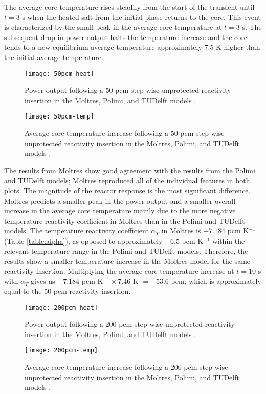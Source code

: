 The average core temperature rises steadily from the start of the transient
until $t=3$ s when the heated salt from the initial phase returns to the core.
This event is characterized by the small peak in the average core temperature
at $t=3$ s. The subsequent drop in power output halts the temperature
increase and the core tends to a new equilibrium average temperature
approximately 7.5 K higher than the initial average temperature.

\begin{figure}[htbp!]
    \centering
    \texttt{[image: 50pcm-heat]}
    \caption{Power output following a 50 pcm step-wise unprotected reactivity
    insertion in the Moltres, Polimi, and
    TUDelft models \cite{fiorina_modelling_2014}.}
    \label{fig:50pcmheat}
%
    \centering
    \texttt{[image: 50pcm-temp]}
    \caption{Average core temperature increase following a 50 pcm step-wise
    unprotected reactivity insertion in the Moltres, Polimi, and
    TUDelft models \cite{fiorina_modelling_2014}.}
    \label{fig:50pcmtemp}
\end{figure}

The results from Moltres show good agreement with the results from the Polimi
and TUDelft models; Moltres reproduced all of the individual features in both
plots. The magnitude of the reactor response is the most significant
difference. Moltres predicts a smaller peak in the power output and a smaller
overall increase in the average core temperature mainly due to the
more negative temperature reactivity coefficient in Moltres than in the Polimi
and TUDelft models. The temperature reactivity coefficient $\alpha_T$ in
Moltres is $-7.184$ pcm K$^{-1}$ (Table \ref{table:alpha}), as opposed to
approximately $-6.5$ pcm K$^{-1}$ within the relevant temperature range in the
Polimi and TUDelft models. Therefore, the results show a smaller temperature
increase in the Moltres model for the same reactivity insertion. Multiplying
the average
core temperature increase at $t=10$ s with $\alpha_T$ gives us $-7.184$ pcm
K$^{-1} \times 7.46$ K $= -53.6$ pcm, which is approximately equal to the 50
pcm reactivity insertion.

\begin{figure}[htbp!]
    \centering
    \texttt{[image: 200pcm-heat]}
    \caption{Power output following a 200 pcm step-wise unprotected reactivity
    insertion in the Moltres, Polimi, and
    TUDelft models \cite{fiorina_modelling_2014}.}
    \label{fig:200pcmheat}
%
    \centering
    \texttt{[image: 200pcm-temp]}
    \caption{Average core temperature increase following a 200 pcm step-wise
    unprotected reactivity insertion in the Moltres, Polimi, and
    TUDelft models \cite{fiorina_modelling_2014}.}
    \label{fig:200pcmtemp}
\end{figure}

